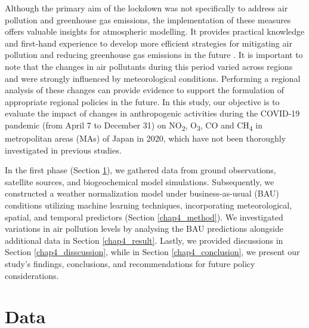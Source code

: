 Although the primary aim of the lockdown was not specifically to address air pollution and greenhouse gas emissions, the implementation of these measures offers valuable insights for atmospheric modelling. It provides practical knowledge and first-hand experience to develop more efficient strategies for mitigating air pollution and reducing greenhouse gas emissions in the future \citep{grange2021covid}. It is important to note that the changes in air pollutants during this period varied across regions and were strongly influenced by meteorological conditions. Performing a regional analysis of these changes can provide evidence to support the formulation of appropriate regional policies in the future. In this study, our objective is to evaluate the impact of changes in anthropogenic activities during the COVID-19 pandemic (from April 7 to December 31) on NO\textsubscript{2}, O\textsubscript{3}, CO and CH\textsubscript{4} in metropolitan areas (MAs) of Japan in 2020, which have not been thoroughly investigated in previous studies. \par

In the first phase (Section \ref{chap4_data}), we gathered data from ground observations, satellite sources, and biogeochemical model simulations. Subsequently, we constructed a weather normalization model under business-as-usual (BAU) conditions utilizing machine learning techniques, incorporating meteorological, spatial, and temporal predictors (Section \ref{chap4_method}). We investigated variations in air pollution levels by analysing the BAU predictions alongside additional data in Section \ref{chap4_result}. Lastly, we provided discussions in Section \ref{chap4_disscussion}, while in Section \ref{chap4_conclusion}, we present our study's findings, conclusions, and recommendations for future policy considerations.\par

\section{Data} \label{chap4_data}
